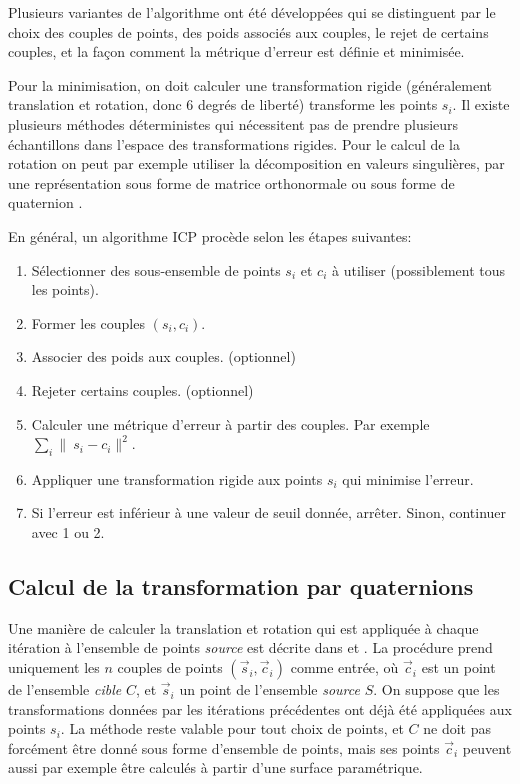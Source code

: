 \documentclass[a4paper,10pt]{scrreprt}
\begin{document}
Plusieurs variantes de l'algorithme ont été développées qui se distinguent par le choix des couples de points, des poids associés aux couples, le rejet de certains couples, et la façon comment la métrique d'erreur est définie et minimisée. \cite{Rusi2001}

Pour la minimisation, on doit calculer une transformation rigide (généralement translation et rotation, donc 6 degrés de liberté) transforme les points $s_i$. Il existe plusieurs méthodes déterministes qui nécessitent pas de prendre plusieurs échantillons dans l'espace des transformations rigides. Pour le calcul de la rotation on peut par exemple utiliser la décomposition en valeurs singulières, par une représentation sous forme de matrice orthonormale ou sous forme de quaternion \cite{Horn1986}.

En général, un algorithme ICP procède selon les étapes suivantes:
\begin{enumerate}
	\item Sélectionner des sous-ensemble de points ${s_i}$ et ${c_i}$ à utiliser (possiblement tous les points).
	\item Former les couples $(s_i, c_i)$.
	\item Associer des poids aux couples. (optionnel)
	\item Rejeter certains couples. (optionnel)
	\item Calculer une métrique d'erreur à partir des couples. Par exemple $\sum_{i} \|\ s_i - c_i \|^2$.
	\item Appliquer une transformation rigide aux points ${s_i}$ qui minimise l'erreur.
	\item Si l'erreur est inférieur à une valeur de seuil donnée, arrêter. Sinon, continuer avec 1 ou 2. 
\end{enumerate}


\subsection{Calcul de la transformation par quaternions} \label{sec:quat_trans}
Une manière de calculer la translation et rotation qui est appliquée à chaque itération à l'ensemble de points \emph{source} est décrite dans \cite{Besl1992} et \cite{Horn1986}. La procédure prend uniquement les $n$ couples de points $(\vec{s}_i, \vec{c}_i)$ comme entrée, où $\vec{c}_i$ est un point de l'ensemble \emph{cible} $C$, et $\vec{s}_i$ un point de l'ensemble \emph{source} $S$. On suppose que les transformations données par les itérations précédentes ont déjà été appliquées aux points $s_i$. La méthode reste valable pour tout choix de points, et $C$ ne doit pas forcément être donné sous forme d'ensemble de points, mais ses points $\vec{c}_i$ peuvent aussi par exemple être calculés à partir d'une surface paramétrique.
\end{document}
